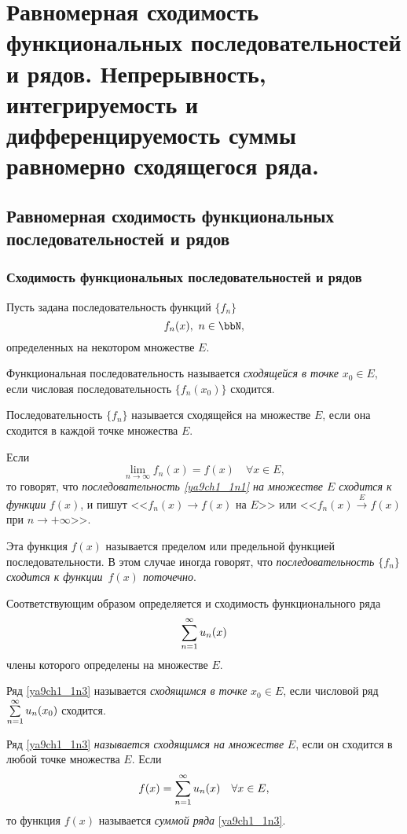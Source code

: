 \chapter{Равномерная сходимость функциональных последовательностей и рядов. Непрерывность, интегрируемость и дифференцируемость суммы равномерно сходящегося ряда.}

\section{Равномерная сходимость функциональных последовательностей и рядов}

\subsection{Сходимость функциональных последовательностей и рядов}

Пусть задана последовательность функций $\{f_n\}$
\begin{equation} \label{ya9ch1_1n1}
f_n(x),\ n\in \bbN, 
\end{equation}
определенных на некотором множестве $E$.
\begin{defn} Функциональная последовательность называется \textit{сходящейся в точке} $x_0 \in E$, если числовая последовательность $\{f_n(x_0)\}$ сходится.

Последовательность $\{f_n\}$ называется сходящейся на множестве $E$, если она сходится в каждой точке множества $E$.

Если
\begin{equation} \label{ya9ch1_1n2}
\lim_{n \to \infty} f_n(x) = f(x)\quad \forall x\in E,
\end{equation}
то говорят, что \textit{последовательность \eqref{ya9ch1_1n1} на множестве $E$ сходится к функции} $f(x)$, и пишут <<$f_n(x)\to f(x)$ на $E$>> или <<$f_n(x) \xrightarrow{E} f(x)$ при $n \to +\infty $>>.

Эта функция $f(x)$ называется пределом или предельной функцией последовательности. В этом случае иногда говорят, что \textit{последовательность $\{f_n\}$ сходится к функции~$f(x)$ поточечно}.
\end{defn}

Соответствующим образом определяется и сходимость функционального ряда
\begin{equation} \label{ya9ch1_1n3}
\sum_{n=1}^{\infty}\limits u_n(x)
\end{equation}
члены которого определены на множестве $E$.
\begin{defn} Ряд \eqref{ya9ch1_1n3} называется \textit{сходящимся в точке} $x_0 \in E$, если числовой ряд $\sum_{n=1}^{\infty}\limits u_n(x_0)$ сходится.

Ряд \eqref{ya9ch1_1n3} \textit{называется сходящимся на множестве} $E$, если он сходится в любой точке множества $E$. Если
\begin{equation} \label{ya9ch1_1n4}
f(x)=\sum_{n=1}^{\infty}\limits u_n(x) \quad\forall x \in E,
\end{equation}
то функция $f(x)$ называется \textit{суммой ряда} \eqref{ya9ch1_1n3}.
\end{defn}

